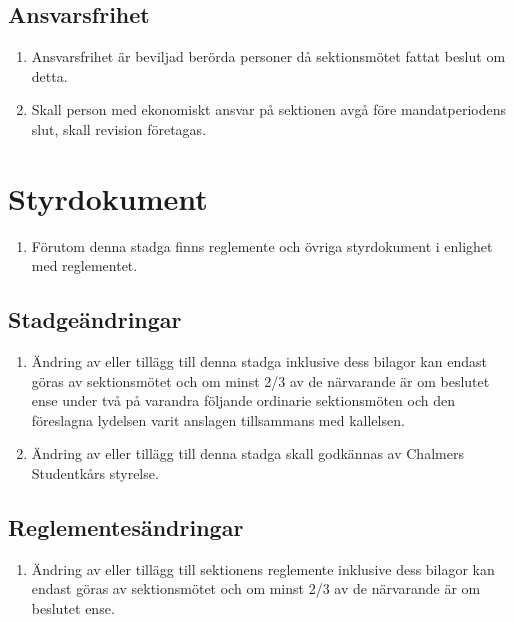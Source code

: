 \documentclass[11pt,a4paper]{article}
\begin{document}
\subsection{Ansvarsfrihet}
\begin{enumerate}[\thesubsection.1]

  \item Ansvarsfrihet är beviljad berörda personer då sektionsmötet
  fattat beslut om detta.

  \item Skall person med ekonomiskt ansvar på sektionen avgå
  före mandatperiodens slut, skall revision företagas.

\end{enumerate}

\newpage

\section{Styrdokument}
\begin{enumerate}[\thesubsection.1]

  \item Förutom denna stadga finns reglemente och övriga styrdokument i enlighet med reglementet. 
  
\end{enumerate}



\subsection{Stadgeändringar}
\begin{enumerate}[\thesubsection.1]

  \item Ändring av eller tillägg till denna stadga inklusive dess
  bilagor kan endast göras av sektionsmötet och om minst 2/3 av de
  närvarande är om beslutet ense under två på varandra följande
  ordinarie sektionsmöten och den föreslagna lydelsen varit anslagen
  tillsammans med kallelsen.

  \item Ändring av eller tillägg till denna stadga skall godkännas av
   Chalmers Studentkårs styrelse.

\end{enumerate}



\subsection{Reglementesändringar}
\begin{enumerate}[\thesubsection.1]

  \item Ändring av eller tillägg till sektionens reglemente inklusive
  dess bilagor kan endast göras av sektionsmötet och om minst 2/3 av
  de närvarande är om beslutet ense.

\end{enumerate}
\end{document}
